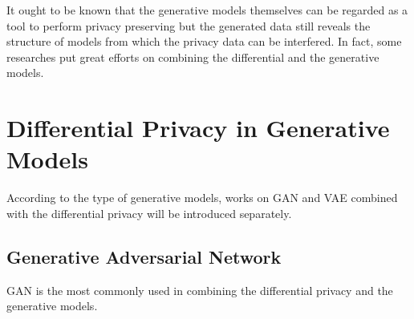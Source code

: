 \documentclass[conference]{IEEEtran}
\begin{document}
It ought to be known that the generative models themselves can be regarded as a tool to perform privacy preserving but the generated data still reveals the structure of models from which the privacy data can be interfered. In fact, some researches put great efforts on combining the differential and the generative models.

\section{Differential Privacy in Generative Models}
According to the type of generative models, works on GAN and VAE combined with the differential privacy will be introduced separately.

\subsection{Generative Adversarial Network}
GAN is the most commonly used in combining the differential privacy and the generative models.
\end{document}
